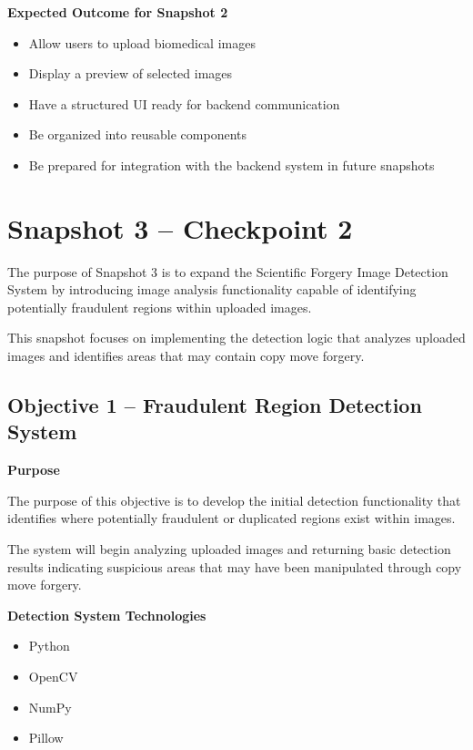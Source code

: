 \documentclass[12pt]{article}
\begin{document}
\textbf{Expected Outcome for Snapshot 2}

\begin{itemize}
    \item Allow users to upload biomedical images
    \item Display a preview of selected images
    \item Have a structured UI ready for backend communication
    \item Be organized into reusable components
    \item Be prepared for integration with the backend system in future snapshots
\end{itemize}

\newpage

\section{Snapshot 3 -- Checkpoint 2}

The purpose of Snapshot 3 is to expand the Scientific Forgery Image Detection System
by introducing image analysis functionality capable of identifying potentially fraudulent
regions within uploaded images.

This snapshot focuses on implementing the detection logic that analyzes uploaded
images and identifies areas that may contain copy move forgery.

\subsection{Objective 1 -- Fraudulent Region Detection System}

\textbf{Purpose}

The purpose of this objective is to develop the initial detection functionality that identifies
where potentially fraudulent or duplicated regions exist within images.

The system will begin analyzing uploaded images and returning basic detection results
indicating suspicious areas that may have been manipulated through copy move
forgery.

\textbf{Detection System Technologies}

\begin{itemize}
    \item Python
    \item OpenCV
    \item NumPy
    \item Pillow
\end{itemize}
\end{document}
